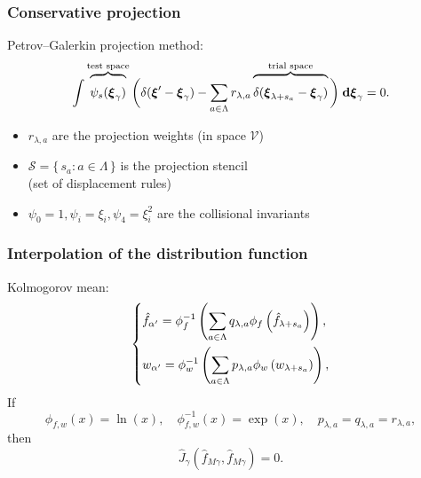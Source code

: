 \documentclass[mathserif]{beamer} %
\newcommand{\dd}{\:\mathrm{d}}
\newcommand{\dxi}{\boldsymbol{\dd\xi}}
\newcommand{\bxi}{\boldsymbol{\xi}}
\newcommand{\Set}[2]{\{\,{#1}:{#2}\,\}}
\newcommand{\xoverbrace}[2][\vphantom{\int}]{\overbrace{#1#2}}
\begin{document}
\begin{frame}
    \frametitle{Conservative projection}
    Petrov--Galerkin projection method:
    \begin{equation}\label{eq:Petrov-Galerkin}
        \int \xoverbrace{ \psi_s(\bxi_\gamma) }^\text{test space} \bigg(
            \delta(\bxi'-\bxi_\gamma) - \sum_{a\in\Lambda} r_{\lambda,a}
            \xoverbrace{ \delta(\bxi_{\lambda+s_a}-\bxi_\gamma) }^\text{trial space}
        \bigg) \dxi_\gamma = 0.
    \end{equation}
    \begin{itemize}
        \item \(r_{\lambda,a}\) are the projection weights (in space \(\mathcal{V}\))
        \item \(\mathcal{S} = \Set{s_a}{a\in\Lambda}\) is the projection stencil \\(set of displacement rules)
        \item \(\psi_0 = 1, \psi_i = \xi_i, \psi_4 = \xi_i^2\) are the collisional invariants
    \end{itemize}
\end{frame}

\begin{frame}
    \frametitle{Interpolation of the distribution function}
    Kolmogorov mean:
    \begin{equation}\label{eq:Kolmogorov_mean}
        \begin{dcases}
            \hat{f}_{\alpha'} = \phi^{-1}_f\left(\sum_{a\in\Lambda} q_{\lambda,a}
                \phi_f\left(\hat{f}_{\lambda+s_a}\right)\right), \\
            w_{\alpha'} = \phi^{-1}_w\left(\sum_{a\in\Lambda} p_{\lambda,a}
                \phi_w\left(w_{\lambda+s_a}\right)\right), \\
        \end{dcases}
    \end{equation}
    If
    \begin{equation}\label{eq:geometric_mean}
       \phi_{f,w}(x) = \ln(x), \quad \phi_{f,w}^{-1}(x) = \exp(x), \quad p_{\lambda,a} = q_{\lambda,a} = r_{\lambda,a},
    \end{equation}
    then
    \begin{equation}\label{eq:strict_interpolation}
        \hat{J}_\gamma(\hat{f}_{M\gamma}, \hat{f}_{M\gamma}) = 0.
    \end{equation}
\end{frame}
\end{document}
